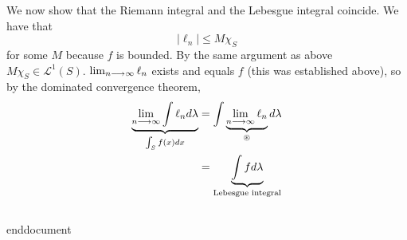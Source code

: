 \documentclass{unswmaths}
\begin{document}
We now show that the Riemann integral and the Lebesgue integral coincide. 
We have that 
$$
    |\ell_n| \leq M \chi_{S} 
$$
for some $ M $ because $ f $ is bounded. By the same argument as above $ M \chi_{S} \in \mathcal{L}^1(S) $. $ \lim_{n\longrightarrow\infty} \ell_n $ exists and equals $ f $ (this was established above), so by the dominated convergence theorem,
\begin{align*}
    \underbrace{\lim_{n\longrightarrow\infty} \int \ell_n d\lambda}_{\int_{S} f(x) dx} &= \int \underbrace{\lim_{n\longrightarrow\infty} \ell_n}_{\circledast} d\lambda \\
    &= \underbrace{\int f d\lambda}_{\text{Lebesgue integral}} \\
\end{align*}

\subsection{}


end{document}
\end{document}
